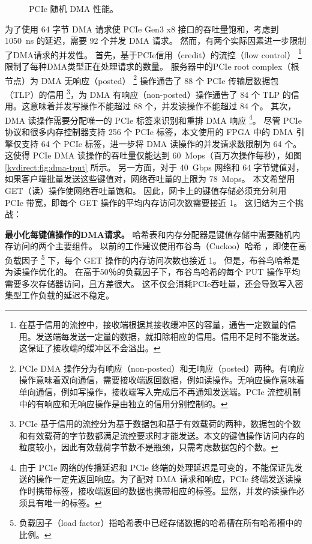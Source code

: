 \begin{figure}[t]
	\centering
	\caption{PCIe 随机 DMA 性能。}
	\label{kvdirect:fig:dma-perf}
\end{figure}

为了使用 64 字节 DMA 请求使 PCIe Gen3 x8 接口的吞吐量饱和，考虑到 1050~ns 的延迟，需要 92 个并发 DMA 请求。
然而，有两个实际因素进一步限制了DMA请求的并发性。
首先，基于PCIe信用（credit）的流控（flow control） \footnote{在基于信用的流控中，接收端根据其接收缓冲区的容量，通告一定数量的信用。发送端每发送一定量的数据，就扣除相应的信用。信用不足时不能发送。这保证了接收端的缓冲区不会溢出。} 限制了每种DMA类型正在处理请求的数量。
服务器中的PCIe root complex（根节点）为 DMA 无响应（posted） \footnote{PCIe DMA 操作分为有响应（non-posted）和无响应（posted）两种。有响应操作意味着双向通信，需要接收端返回数据，例如读操作。无响应操作意味着单向通信，例如写操作，接收端写入完成后不再通知发送端。PCIe 流控机制中的有响应和无响应操作是由独立的信用分别控制的。} 操作通告了 88 个 PCIe 传输层数据包（TLP）的信用 \footnote{PCIe 基于信用的流控分为基于数据包和基于有效载荷的两种，数据包的个数和有效载荷的字节数都满足流控要求时才能发送。本文的键值操作访问内存的粒度较小，因此有效载荷字节数不是瓶颈，只需考虑数据包的个数。}，为 DMA 有响应（non-posted）操作通告了 84 个 TLP 的信用。这意味着并发写操作不能超过 88 个，并发读操作不能超过 84 个。
其次，DMA 读操作需要分配唯一的 PCIe 标签来识别和重排 DMA 响应 \footnote{由于 PCIe 网络的传播延迟和 PCIe 终端的处理延迟是可变的，不能保证先发送的操作一定先返回响应。为了配对 DMA 请求和响应，PCIe 终端发送读操作时携带标签，接收端返回的数据也携带相应的标签。显然，并发的读操作必须具有唯一的标签。}。
尽管 PCIe 协议和很多内存控制器支持 256 个 PCIe 标签，本文使用的 FPGA 中的 DMA 引擎仅支持 64 个 PCIe 标签，进一步将 DMA 读操作的并发请求数限制为 64 个。这使得 PCIe DMA 读操作的吞吐量仅能达到 60~Mops（百万次操作每秒），如图 \ref {kvdirect:fig:dma-tput} 所示。
另一方面，对于 40~Gbps 网络和 64 字节键值对，如果客户端批量发送这些键值对，网络吞吐量的上限为 78~Mops。
本文希望用 GET（读）操作使网络吞吐量饱和。
因此，网卡上的键值存储必须充分利用 PCIe 带宽，即每个 GET 操作的平均内存访问次数需要接近 1。
这归结为三个挑战：

\textbf {最小化每键值操作的DMA请求。}
哈希表和内存分配器是键值存储中需要随机内存访问的两个主要组件。
以前的工作建议使用布谷鸟（Cuckoo）哈希 \cite {dragojevic2014farm,breslow2016horton}，即使在高负载因子 \footnote{负载因子（load factor）指哈希表中已经存储数据的哈希槽在所有哈希槽中的比例。} 下，每个 GET 操作的内存访问次数也接近 1。
但是，布谷鸟哈希是为读操作优化的。
在高于50％的负载因子下，布谷鸟哈希的每个 PUT 操作平均需要多次存储器访问，且方差很大。
这不仅会消耗PCIe吞吐量，还会导致写入密集型工作负载的延迟不稳定。

